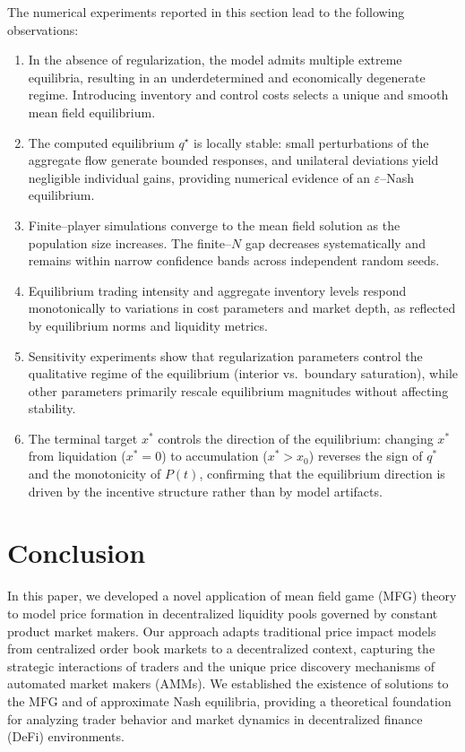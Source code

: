 \documentclass[11pt]{article}
\theoremstyle{definition}
\begin{document}
The numerical experiments reported in this section lead to the following observations:
\begin{enumerate}
    \item In the absence of regularization, the model admits multiple extreme equilibria, resulting in an underdetermined and economically degenerate regime. Introducing inventory and control costs selects a unique and smooth mean field equilibrium.
    
    \item The computed equilibrium $q^\star$ is locally stable: small perturbations of the aggregate flow generate bounded responses, and unilateral deviations yield negligible individual gains, providing numerical evidence of an $\varepsilon$--Nash equilibrium.
    
    \item Finite--player simulations converge to the mean field solution as the population size increases. The finite--$N$ gap decreases systematically and remains within narrow confidence bands across independent random seeds.
    
    \item Equilibrium trading intensity and aggregate inventory levels respond monotonically to variations in cost parameters and market depth, as reflected by equilibrium norms and liquidity metrics.
    
    \item Sensitivity experiments show that regularization parameters control the qualitative regime of the equilibrium (interior vs.\ boundary saturation), while other parameters primarily rescale equilibrium magnitudes without affecting stability.

    \item The terminal target $x^*$ controls the direction of the equilibrium: changing $x^*$ from liquidation ($x^*=0$) to accumulation ($x^*>x_0$) reverses the sign of $q^*$ and the monotonicity of $P(t)$, confirming that the equilibrium direction is driven by the incentive structure rather than by model artifacts.
\end{enumerate}

\section{Conclusion}

In this paper, we developed a novel application of mean field game (MFG) theory to model price formation in decentralized liquidity pools governed by constant product market makers. Our approach adapts traditional price impact models from centralized order book markets to a decentralized context, capturing the strategic interactions of traders and the unique price discovery mechanisms of automated market makers (AMMs). We established the existence of solutions to the MFG and of approximate Nash equilibria, providing a theoretical foundation for analyzing trader behavior and market dynamics in decentralized finance (DeFi) environments.
\end{document}
